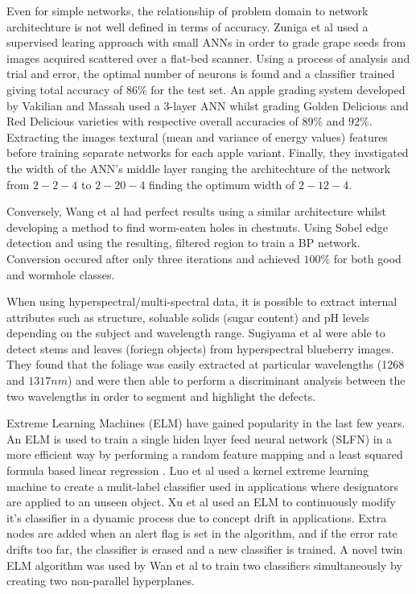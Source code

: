 \documentclass[fleqn,twoside]{article}
\begin{document}
Even for simple networks, the relationship of problem domain to network architechture is not well defined in terms of accuracy. Zuniga et al \cite{zuniga} used a supervised learing approach with small ANNs in order to grade grape seeds from images acquired scattered over a flat-bed scanner. Using a process of analysis and trial and error, the optimal number of neurons is found and a classifier trained giving total accuracy of $86\%$ for the test set. An apple grading system developed by Vakilian and Massah \cite{vakilian} used a 3-layer ANN whilst grading Golden Delicious and Red Delicious varieties with respective overall accuracies of $89\%$ and $92\%$. Extracting the images textural (mean and variance of energy values) features before training separate networks for each apple variant. Finally, they invstigated the width of the ANN's middle layer ranging the architechture of the network from $2-2-4$ to $2-20-4$ finding the optimum width of $2-12-4$. 

Conversely, Wang et al \cite{wang} had perfect results using a similar architecture whilst developing a method to find worm-eaten holes in chestnuts. Using Sobel edge detection and using the resulting, filtered region to train a BP network. Conversion occured after only three iterations and achieved $100\%$ for both good and wormhole classes.

When using hyperspectral/multi-spectral data, it is possible to extract internal attributes such as structure, soluable solids (sugar content) and pH levels depending on the subject and wavelength range. Sugiyama et al \cite{sugiyama} were able to detect stems and leaves (foriegn objects) from hyperspectral blueberry images. They found that the foliage was easily extracted at particular wavelengths (1268 and $1317nm$) and were then able to perform a discriminant analysis between the two wavelengths in order to segment and highlight the defects.

Extreme Learning Machines (ELM) have gained popularity in the last few years. An ELM is used to train a single hiden layer feed neural network (SLFN) in a more efficient way by performing a random feature mapping and a least squared formula based linear regression \cite{peng}. Luo et al \cite{luo} used a kernel extreme learning machine to create a mulit-label classifier used in applications where designators are applied to an unseen object. Xu et al \cite{xu} used an ELM to continuously modify it's classifier in a dynamic process due to concept drift in applications. Extra nodes are added when an alert flag is set in the algorithm, and if the error rate drifts too far, the classifier is erased and a new classifier is trained. A novel twin ELM algorithm was used by Wan et al \cite{wan} to train two classifiers simultaneously by creating two non-parallel hyperplanes. 
\end{document}

